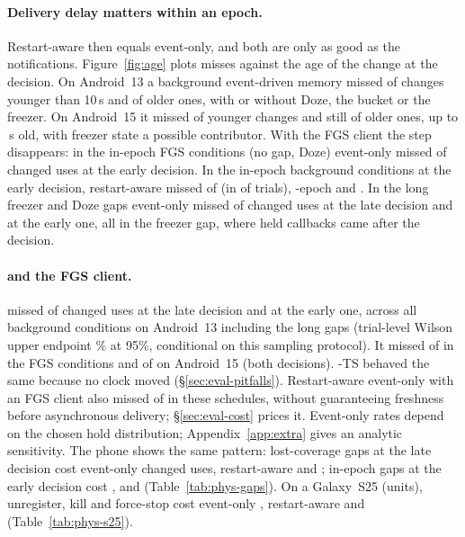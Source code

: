 \paragraph{Delivery delay matters within an epoch.} Restart-aware then equals event-only, and both are only as good as the notifications. Figure~\ref{fig:age} plots misses against the age of the change at the decision. On Android~13 a background event-driven memory missed \AgeALtK of \AgeALtN changes younger than 10\,s and \AgeAGeK of \AgeAGeN older ones, with or without Doze, the bucket or the freezer. On Android~15 it missed \AgeBLtK of \AgeBLtN younger changes and still \AgeBGeK of \AgeBGeN older ones, up to \AgeMaxMissB\,s old, with freezer state a possible contributor. With the FGS client the step disappears: in the in-epoch FGS conditions (no gap, Doze) event-only missed \FgInEarlyEvK of \FgInEarlyChanged changed uses at the early decision. In the in-epoch background conditions at the early decision, restart-aware missed \SuspEvrK of \SuspChanged (in \SuspEvrTK of \SuspTrials trials), \stamp-epoch \SuspLmeK and \stamp \SuspLmK. In the long freezer and Doze gaps event-only missed \LongLateEvK of \LongLateChanged changed uses at the late decision and \LongEarlyEvK at the early one, all in the freezer gap, where held callbacks came after the decision.

\paragraph{\stamp and the FGS client.} \stamp missed \AllLmK of \AllChanged changed uses at the late decision and \AllEarlyLmK at the early one, across all background conditions on Android~13 including the long gaps (trial-level Wilson upper endpoint \AllLmTHi\% at 95\%, conditional on this sampling protocol). It missed \FgAnyLmK of \FgAnyChanged in the FGS conditions and \ApiAnyLmK of \ApiAnyChanged on Android~15 (both decisions). \stamp-TS behaved the same because no clock moved (\S\ref{sec:eval-pitfalls}). Restart-aware event-only with an FGS client also missed \FgAnyEvrK of \FgAnyChanged in these schedules, without guaranteeing freshness before asynchronous delivery; \S\ref{sec:eval-cost} prices it. Event-only rates depend on the chosen hold distribution; Appendix~\ref{app:extra} gives an analytic sensitivity. The phone shows the same pattern: lost-coverage gaps at the late decision cost event-only \PhysGapLostEv changed uses, restart-aware \PhysGapLostEvr and \stamp \PhysGapLostLm; in-epoch gaps at the early decision cost \PhysGapInEpochEv, \PhysGapInEpochEvr and \PhysGapInEpochLm (Table~\ref{tab:phys-gaps}).\ifPhysSamsung{} On a Galaxy~S25 (\PhysSamsungGapUnits units), unregister, kill and force-stop cost event-only \PhysSamsungGapLostEv, restart-aware \PhysSamsungGapLostEvr and \stamp \PhysSamsungGapLostLm (Table~\ref{tab:phys-s25}).\fi

